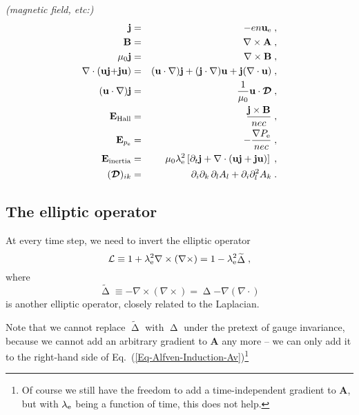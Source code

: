 \documentclass[\mydriver,12pt,twoside,notitlepage,letterpaper]{article}
\newcommand{\matx}[1]{\mbox{\boldmath${\cal #1}$\unboldmath}}
\newcommand{\tensor}[1]{\matx{#1}}
\newcommand{\Av}      {\mathbf{A}}
\newcommand{\Bv}      {\mathbf{B}}
\newcommand{\Ev}      {\mathbf{E}}
\newcommand{\jv}      {\mathbf{j}}
\newcommand{\Laplace} { \mathop{\Delta}\nolimits}
\newcommand{\uv}      {\mathbf{u}}
\newcommand{\uve}     {\uv_{\rm e}}
\begin{document}
\emph{(magnetic field, etc:)}
\begin{eqnarray}
  \jv              &=& - e n \uve \; , \\
  \Bv              &=& \nabla\times\Av \; , \\
  \mu_0 \jv        &=& \nabla\times\Bv \; , \\
  \nabla\cdot(\uv\jv {+} \jv\uv)
                   &=& (\uv\cdot\nabla)\jv
                       + (\jv\cdot\nabla)\uv
                       + \jv(\nabla\cdot\uv)\; , \\
  (\uv\cdot\nabla)\jv
                   &=& \dfrac{1}{\mu_0} \uv\cdot \tensor{D} \; , \\
  \Ev_{\rm Hall}   &=& \dfrac{\jv\times\Bv}{n e c} \; , \\
  \Ev_{p_{\rm e}}  &=& - \dfrac{\nabla P_{\rm e}}{n e c} \; , \\
  \Ev_{\rm inertia}
  &=&  \mu_0 \lambda_{\rm e}^2
      \left[
        \partial_t \jv
        + \nabla\cdot(\uv \jv + \jv \uv)
      \right] \; , \\
  (\tensor{D})_{ik}
                   &=& \partial_i\partial_k\, \partial_l A_l
                       + \partial_i \partial_l^2 A_k \; . \\ 
\end{eqnarray}



\subsection{The elliptic operator}

At every time step, we need to invert the elliptic operator
\begin{equation}
  \mathcal{L}
  \equiv 1 +\lambda_{\rm e}^2 \nabla\times (\nabla\times)
  = 1 - \lambda_{\rm e}^2 \widetilde{\Laplace} \; ,
\end{equation}
where
\begin{equation}
   \widetilde{\Laplace}
   \equiv -\nabla\times (\nabla\times)
   = \Laplace - \nabla (\nabla \cdot)
\end{equation}
is another elliptic operator, closely related to the Laplacian.

Note that we cannot replace $\widetilde{\Laplace}$ with $\Laplace$ under
the pretext of gauge invariance, because we cannot add an arbitrary
gradient to $\Av$ any more -- we can only add it to the right-hand side of
Eq.~(\ref{Eq-Alfven-Induction-Av})\footnote{Of course we still have the
  freedom to add a time-independent gradient to $\Av$, but with
  $\lambda_{\rm e}$ being a function of time, this does not help.}
\end{document}
